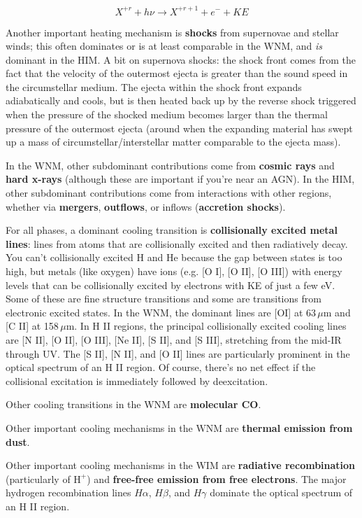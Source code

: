 \documentclass[12pt, letterpaper, preprint]{aastex}
\begin{document}
\begin{enumerate}
\begin{equation}
X^{+r} + h\nu \rightarrow X^{+r+1} + e^- + KE
\label{photoionization}
\end{equation}

Another important heating mechanism is \textbf{shocks} from supernovae and stellar winds; this often dominates or is at least comparable in the WNM, and \emph{is} dominant in the HIM. A bit on supernova shocks: the shock front comes from the fact that the velocity of the outermost ejecta is greater than the sound speed in the circumstellar medium. The ejecta within the shock front expands adiabatically and cools, but is then heated back up by the reverse shock triggered when the pressure of the shocked medium becomes larger than the thermal pressure of the outermost ejecta (around when the expanding material has swept up a mass of circumstellar/interstellar matter comparable to the ejecta mass).

In the WNM, other subdominant contributions come from \textbf{cosmic rays} and \textbf{hard x-rays} (although these are important if you're near an AGN). In the HIM, other subdominant contributions come from interactions with other regions, whether via \textbf{mergers}, \textbf{outflows}, or inflows (\textbf{accretion shocks}). 

For all phases, a dominant cooling transition is \textbf{collisionally excited metal lines}: lines from atoms that are collisionally excited and then radiatively decay. 
You can't collisionally excited H and He because the gap between states is too high, but metals (like oxygen) have ions (e.g. [O I], [O II], [O III]) with energy levels that can be collisionally excited by electrons with KE of just a few eV.
Some of these are fine structure transitions and some are transitions from electronic excited states. 
In the WNM, the dominant lines are [OI] at 63\,$\mu$m and [C II] at 158\,$\mu$m. In H II regions, the principal collisionally excited cooling lines are [N II], [O II], [O III], [Ne II], [S II], and [S III], stretching from the mid-IR through UV. The [S II], [N II], and [O II] lines are particularly prominent in the optical spectrum of an H II region.
Of course, there's no net effect if the collisional excitation is immediately followed by deexcitation.

Other cooling transitions in the WNM are \textbf{molecular CO}. 

Other important cooling mechanisms in the WNM are \textbf{thermal emission from dust}.

Other important cooling mechanisms in the WIM are \textbf{radiative recombination} (particularly of $\mathrm{H}^+$) and \textbf{free-free emission from free electrons}. The major hydrogen recombination lines $H \alpha$, $H \beta$, and $H \gamma$ dominate the optical spectrum of an H II region. 


\end{enumerate}
\end{document}

